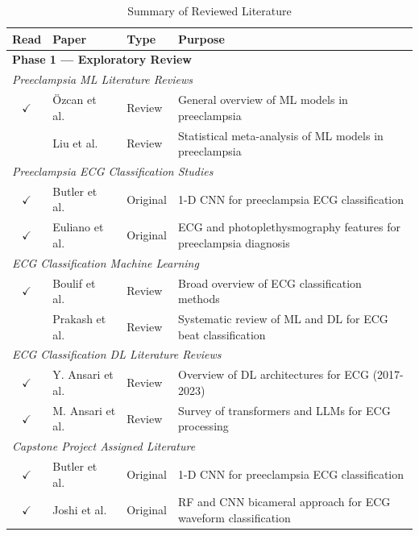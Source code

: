 \documentclass[sigconf,nonacm]{acmart}
\begin{document}
\begin{table}[h]
\caption{Summary of Reviewed Literature}
\label{tab:literature}
\small
\centering
\begin{tabular}{cp{}p{}p{}}
\toprule
\textbf{Read} & \textbf{Paper} & \textbf{Type} & \textbf{Purpose} \\
\midrule
\multicolumn{4}{l}{\textbf{Phase 1 --- Exploratory Review}} \\[2pt]
\multicolumn{4}{l}{\textit{Preeclampsia ML Literature Reviews}} \\
$\checkmark$ & Özcan et al.~\cite{ozcan_preeclampsia_2025} & Review & General overview of ML models in preeclampsia \\
 & Liu et al.~\cite{liu_machine_2026} & Review & Statistical meta-analysis of ML models in preeclampsia \\
\midrule
\multicolumn{4}{l}{\textit{Preeclampsia ECG Classification Studies}} \\
$\checkmark$ & Butler et al.~\cite{butler_ai-based_2024} & Original & 1-D CNN for preeclampsia ECG classification \\
$\checkmark$ & Euliano et al.~\cite{euliano_photoplethysmography_2018} & Original & ECG and photoplethysmography features for preeclampsia diagnosis \\
\midrule
\multicolumn{4}{l}{\textit{ECG Classification Machine Learning}} \\
$\checkmark$ & Boulif et al.~\cite{boulif_literature_2023} & Review & Broad overview of ECG classification methods \\
 & Prakash et al.~\cite{jaya_prakash_advances_2025} & Review & Systematic review of ML and DL for ECG beat classification \\
\midrule
\multicolumn{4}{l}{\textit{ECG Classification DL Literature Reviews}} \\
$\checkmark$ & Y. Ansari et al.~\cite{ansari_deep_2023} & Review & Overview of DL architectures for ECG (2017-2023) \\
$\checkmark$ & M. Ansari et al.~\cite{ansari_survey_2025} & Review & Survey of transformers and LLMs for ECG processing \\
\midrule
\multicolumn{4}{l}{\textit{Capstone Project Assigned Literature}} \\
$\checkmark$ & Butler et al.~\cite{butler_ai-based_2024} & Original & 1-D CNN for preeclampsia ECG classification \\
$\checkmark$ & Joshi et al.~\cite{joshi_linking_2025} & Original & RF and CNN bicameral approach for ECG waveform classification \\

\end{tabular}
\end{table}
\end{document}
